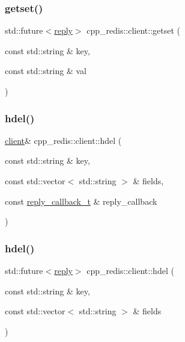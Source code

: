 \mbox{\label{classcpp__redis_1_1client_abcbf060105acb8b1d7b14a5102be19a0}} 
\subsubsection{\texorpdfstring{getset()}{getset()}\hspace{0.1cm}{\footnotesize\ttfamily [2/2]}}
{\footnotesize\ttfamily std\+::future$<$\hyperlink{classcpp__redis_1_1reply}{reply}$>$ cpp\+\_\+redis\+::client\+::getset (\begin{DoxyParamCaption}\item[{const std\+::string \&}]{key,  }\item[{const std\+::string \&}]{val }\end{DoxyParamCaption})}

\mbox{\label{classcpp__redis_1_1client_adc62af1a2d07d04fbf274f98f374ab47}} 
\subsubsection{\texorpdfstring{hdel()}{hdel()}\hspace{0.1cm}{\footnotesize\ttfamily [1/2]}}
{\footnotesize\ttfamily \hyperlink{classcpp__redis_1_1client}{client}\& cpp\+\_\+redis\+::client\+::hdel (\begin{DoxyParamCaption}\item[{const std\+::string \&}]{key,  }\item[{const std\+::vector$<$ std\+::string $>$ \&}]{fields,  }\item[{const \hyperlink{classcpp__redis_1_1client_a061a1140d36d2eaeda82b09a0bb3f9f2}{reply\+\_\+callback\+\_\+t} \&}]{reply\+\_\+callback }\end{DoxyParamCaption})}

\mbox{\label{classcpp__redis_1_1client_a56d4df4d31ffc56e097a8a78cb85d861}} 
\subsubsection{\texorpdfstring{hdel()}{hdel()}\hspace{0.1cm}{\footnotesize\ttfamily [2/2]}}
{\footnotesize\ttfamily std\+::future$<$\hyperlink{classcpp__redis_1_1reply}{reply}$>$ cpp\+\_\+redis\+::client\+::hdel (\begin{DoxyParamCaption}\item[{const std\+::string \&}]{key,  }\item[{const std\+::vector$<$ std\+::string $>$ \&}]{fields }\end{DoxyParamCaption})}

